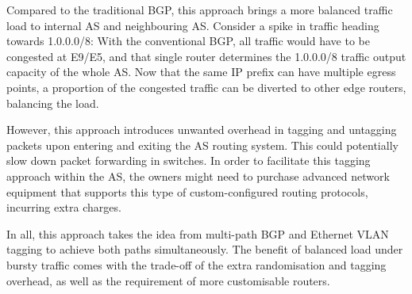 \documentclass[12pt]{article}
\begin{document}
Compared to the traditional BGP, this approach brings a more balanced traffic load to internal AS and neighbouring AS. Consider a spike in traffic heading towards 1.0.0.0/8: With the conventional BGP, all traffic would have to be congested at E9/E5, and that single router determines the 1.0.0.0/8 traffic output capacity of the whole AS. Now that the same IP prefix can have multiple egress points, a proportion of the congested traffic can be diverted to other edge routers, balancing the load.

However, this approach introduces unwanted overhead in tagging and untagging packets upon entering and exiting the AS routing system. This could potentially slow down packet forwarding in switches. In order to facilitate this tagging approach within the AS, the owners might need to purchase advanced network equipment that supports this type of custom-configured routing protocols, incurring extra charges.

In all, this approach takes the idea from multi-path BGP and Ethernet VLAN tagging to achieve both paths simultaneously. The benefit of balanced load under bursty traffic comes with the trade-off of the extra randomisation and tagging overhead, as well as the requirement of more customisable routers.
\end{document}
